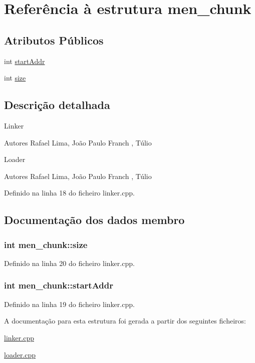 \hypertarget{structmen__chunk}{\section{Referência à estrutura men\-\_\-chunk}
\label{structmen__chunk}
}
\subsection*{Atributos Públicos}
\begin{DoxyCompactItemize}
\item 
int \hyperlink{structmen__chunk_ad579c5709fcd2519b9361eff5e6fa619}{start\-Addr}
\item 
int \hyperlink{structmen__chunk_a00ffe3e55e851fa9f9e4059e5b0257cb}{size}
\end{DoxyCompactItemize}


\subsection{Descrição detalhada}
Linker

\begin{DoxyAuthor}{Autores}
Rafael Lima, João Paulo Franch , Túlio
\end{DoxyAuthor}
Loader

\begin{DoxyAuthor}{Autores}
Rafael Lima, João Paulo Franch , Túlio 
\end{DoxyAuthor}


Definido na linha 18 do ficheiro linker.\-cpp.



\subsection{Documentação dos dados membro}
\hypertarget{structmen__chunk_a00ffe3e55e851fa9f9e4059e5b0257cb}{
\subsubsection[{size}]{\setlength{\rightskip}{0pt plus 5cm}int men\-\_\-chunk\-::size}}\label{structmen__chunk_a00ffe3e55e851fa9f9e4059e5b0257cb}


Definido na linha 20 do ficheiro linker.\-cpp.

\hypertarget{structmen__chunk_ad579c5709fcd2519b9361eff5e6fa619}{
\subsubsection[{start\-Addr}]{\setlength{\rightskip}{0pt plus 5cm}int men\-\_\-chunk\-::start\-Addr}}\label{structmen__chunk_ad579c5709fcd2519b9361eff5e6fa619}


Definido na linha 19 do ficheiro linker.\-cpp.



A documentação para esta estrutura foi gerada a partir dos seguintes ficheiros\-:\begin{DoxyCompactItemize}
\item 
\hyperlink{linker_8cpp}{linker.\-cpp}\item 
\hyperlink{loader_8cpp}{loader.\-cpp}\end{DoxyCompactItemize}
